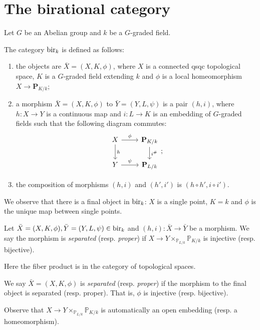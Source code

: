 \section{The birational category}
Let $G$ be an Abelian group and $k$ be a $G$-graded field.

\begin{definition}
    The category $\mathrm{bir}_k$ is defined as follows: 
    \begin{enumerate}
        \item the objects are $\bar{X}=(X,K,\phi)$, where $X$ is a connected qsqc topological space, $K$ is a $G$-graded field extending $k$ and $\phi$ is a local homeomorphism $X\rightarrow \mathbf{P}_{K/k}$;
        \item a morphism $\bar{X}=(X,K,\phi)$ to $\bar{Y}=(Y,L,\psi)$ is a pair $(h,i)$, where $h:X\rightarrow Y$ is a continuous map and $i:L\rightarrow K$ is an embedding of $G$-graded fields such that the following diagram commutes:
        \[
            \begin{tikzcd}
                X \arrow[d, "h"] \arrow[r, "\phi"] & \mathbf{P}_{K/k} \arrow[d, "i^{\#}"] \\
                Y \arrow[r, "\psi"]                & \mathbf{P}_{L/k}                    
            \end{tikzcd};
        \]
        \item the composition of morphisms $(h,i)$ and $(h',i')$ is $(h\circ h',i\circ i')$.
    \end{enumerate}
\end{definition}
We observe that there is a final object in $\mathrm{bir}_k$: $X$ is a single point, $K=k$ and $\phi$ is the unique map between single points.

\begin{definition}
    Let $\bar{X}=(X,K,\phi),\bar{Y}=(Y,L,\psi)\in \mathrm{bir}_k$ and $(h,i):\bar{X}\rightarrow \bar{Y}$ be a morphism. We say the morphism is \emph{separated} (resp. \emph{proper}) if $X\rightarrow Y\times_{\mathbb{P}_{L/k}}\mathbb{P}_{K/k}$ is injective (resp. bijective).

    Here the fiber product is in the category of topological spaces.

    We say $\bar{X}=(X,K,\phi)$ is \emph{separated} (resp. \emph{proper}) if the morphism to the final object is separated (resp. proper). That is, $\phi$ is injective (resp. bijective).
\end{definition}
Observe that $X\rightarrow Y\times_{\mathbb{P}_{L/k}}\mathbb{P}_{K/k}$ is automatically an open embedding (resp. a homeomorphism).

